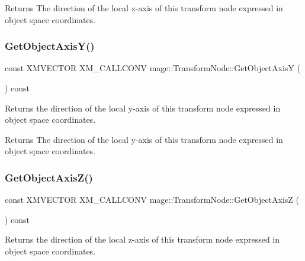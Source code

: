\begin{DoxyReturn}{Returns}
The direction of the local x-\/axis of this transform node expressed in object space coordinates. 
\end{DoxyReturn}
\hypertarget{classmage_1_1_transform_node_adb04c750404af13380ae5321874693f2}{}\label{classmage_1_1_transform_node_adb04c750404af13380ae5321874693f2} 
\subsubsection{\texorpdfstring{Get\+Object\+Axis\+Y()}{GetObjectAxisY()}}
{\footnotesize\ttfamily const X\+M\+V\+E\+C\+T\+OR X\+M\+\_\+\+C\+A\+L\+L\+C\+O\+NV mage\+::\+Transform\+Node\+::\+Get\+Object\+AxisY (\begin{DoxyParamCaption}{ }\end{DoxyParamCaption}) const\hspace{0.3cm}{\ttfamily [noexcept]}}

Returns the direction of the local y-\/axis of this transform node expressed in object space coordinates.

\begin{DoxyReturn}{Returns}
The direction of the local y-\/axis of this transform node expressed in object space coordinates. 
\end{DoxyReturn}
\hypertarget{classmage_1_1_transform_node_a0272f2c152c933f4b239cc9c818530c9}{}\label{classmage_1_1_transform_node_a0272f2c152c933f4b239cc9c818530c9} 
\subsubsection{\texorpdfstring{Get\+Object\+Axis\+Z()}{GetObjectAxisZ()}}
{\footnotesize\ttfamily const X\+M\+V\+E\+C\+T\+OR X\+M\+\_\+\+C\+A\+L\+L\+C\+O\+NV mage\+::\+Transform\+Node\+::\+Get\+Object\+AxisZ (\begin{DoxyParamCaption}{ }\end{DoxyParamCaption}) const\hspace{0.3cm}{\ttfamily [noexcept]}}

Returns the direction of the local z-\/axis of this transform node expressed in object space coordinates.

